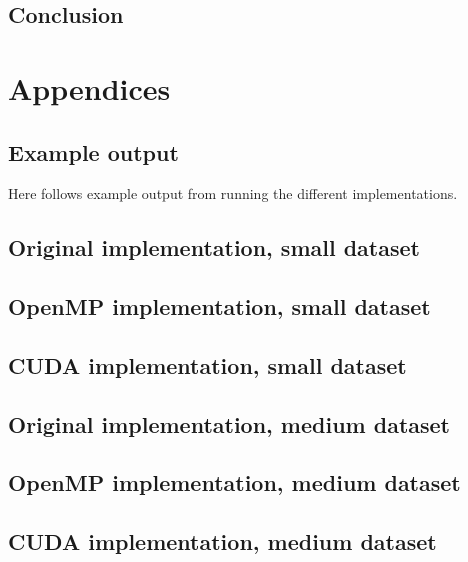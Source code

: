 \documentclass[11pt]{article}
\begin{document}
\subsection{Conclusion}

\newpage
\section{Appendices}
\subsection{Example output}
Here follows example output from running the different implementations.

\subsection{Original implementation, small dataset}

\subsection{OpenMP implementation, small dataset}

\subsection{CUDA implementation, small dataset}


\subsection{Original implementation, medium dataset}

\subsection{OpenMP implementation, medium dataset}

\subsection{CUDA implementation, medium dataset}

\end{document}
